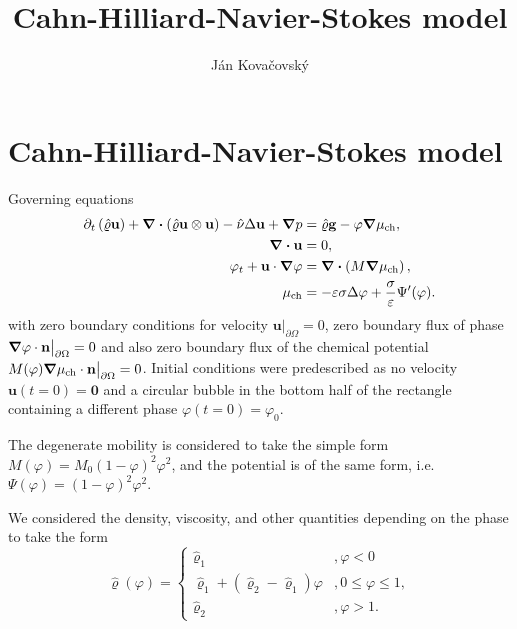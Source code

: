 \documentclass{article} %
\title{Cahn-Hilliard-Navier-Stokes model}
\author{Ján Kovačovský}
\newcommand{\velocity}{\mathbf{u}}
\newcommand{\pressure}{p}
\newcommand{\phase}{\varphi}
\newcommand{\chempot}{\mu_{\text{ch}}}
\newcommand{\density}{\hat{\varrho}}
\newcommand{\viscosity}{\hat{\nu}}
\newcommand{\mobility}{M}
\newcommand{\gravity}{\mathbf{g}}
\newcommand{\potential}{\Psi}
\begin{document}
\section*{Cahn-Hilliard-Navier-Stokes model}

Governing equations
\begin{align*}
 \partial_t \left(\density \velocity\right) + \div\left(\density \velocity \otimes \velocity\right) - \viscosity \Delta{\velocity} + \grad{\pressure} &= \density \gravity - \phase \grad{\chempot}, \\
    \div{\velocity} &= 0, \\
 \phase_t + \velocity \cdot \grad{\phase} &= \div{\left(\mobility \grad{\chempot}\right)}, \\
 \chempot &= -\varepsilon \sigma \Delta \phase + \frac{\sigma}{\varepsilon} \potential'(\phase).
\end{align*}
with zero boundary conditions for velocity $\velocity\big|_{\partial \Omega} = 0$, zero boundary flux of phase $\grad{\phase} \cdot \mathbf{n} \big|_{\partial \Omega}= 0$ and also zero boundary flux of the chemical potential $\mobility(\phase) \grad{\chempot} \cdot \mathbf{n} \big|_{\partial \Omega} = 0$. Initial conditions were predescribed as no velocity $\velocity(t = 0) = \mathbf{0}$ and a circular bubble in the bottom half of the rectangle containing a different phase $\phase(t = 0) = \phase_0$.

The degenerate mobility is considered to take the simple form $M(\phase) = M_0 \left(1 - \phase\right)^2 \phase^2$, and the potential is of the same form, i.e. $\potential(\phase) = \left(1 - \phase\right)^2 \phase^2$.

We considered the density, viscosity, and other quantities depending on the phase to take the form
\begin{equation*}
 \density(\phase) = \begin{cases} 
 \density_1 &, \phase < 0 \\
 \density_1 + (\density_2 - \density_1) \phase &, 0 \leq \phase \leq 1, \\
 \density_2 &, \phase > 1.
                \end{cases}
\end{equation*}
\end{document}
